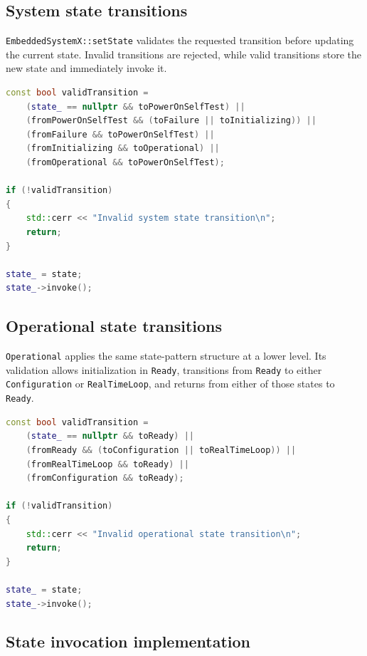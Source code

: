 \documentclass[12pt]{article}
\begin{document}
\subsection{System state transitions}

\texttt{EmbeddedSystemX::setState} validates the requested transition before
updating the current state. Invalid transitions are rejected, while valid
transitions store the new state and immediately invoke it.

\begin{lstlisting}[caption={Validation and application of a system-state transition.}, label={lst:system-state-transition}, language={C++}]
const bool validTransition =
    (state_ == nullptr && toPowerOnSelfTest) ||
    (fromPowerOnSelfTest && (toFailure || toInitializing)) ||
    (fromFailure && toPowerOnSelfTest) ||
    (fromInitializing && toOperational) ||
    (fromOperational && toPowerOnSelfTest);

if (!validTransition)
{
    std::cerr << "Invalid system state transition\n";
    return;
}

state_ = state;
state_->invoke();
\end{lstlisting}

\subsection{Operational state transitions}

\texttt{Operational} applies the same state-pattern structure at a lower
level. Its validation allows initialization in \texttt{Ready}, transitions
from \texttt{Ready} to either \texttt{Configuration} or
\texttt{RealTimeLoop}, and returns from either of those states to
\texttt{Ready}.
\newpage
\begin{lstlisting}[caption={Validation and application of an operational-state transition.}, label={lst:operational-state-transition}, language={C++}]
const bool validTransition =
    (state_ == nullptr && toReady) ||
    (fromReady && (toConfiguration || toRealTimeLoop)) ||
    (fromRealTimeLoop && toReady) ||
    (fromConfiguration && toReady);

if (!validTransition)
{
    std::cerr << "Invalid operational state transition\n";
    return;
}

state_ = state;
state_->invoke();
\end{lstlisting}

\subsection{State invocation implementation}
\end{document}
